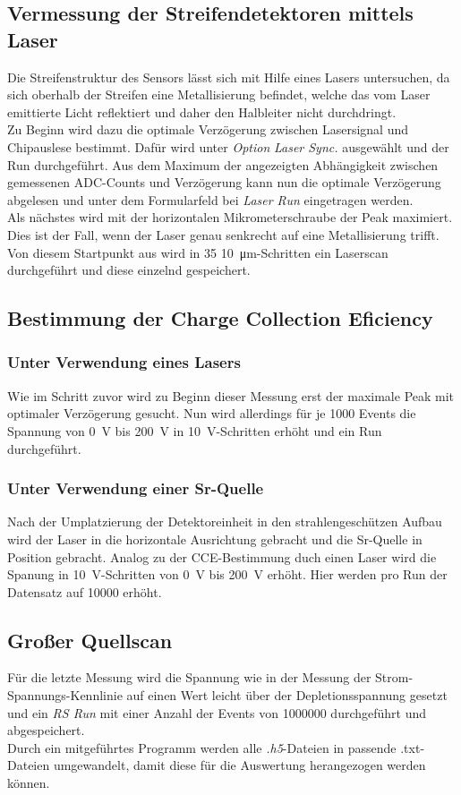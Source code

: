 \FloatBarrier
\subsection{Vermessung der Streifendetektoren mittels Laser}
\label{sec:Vermessung_Laser}
Die Streifenstruktur des Sensors lässt sich mit Hilfe eines Lasers untersuchen, da sich oberhalb der Streifen eine Metallisierung befindet, welche das vom Laser emittierte Licht reflektiert und daher den Halbleiter nicht durchdringt.\\
Zu Beginn wird dazu die optimale Verzögerung zwischen Lasersignal und Chipauslese bestimmt. Dafür wird unter \textit{Option} \textit{Laser Sync.} ausgewählt und der Run durchgeführt. Aus dem Maximum der angezeigten Abhängigkeit zwischen gemessenen ADC-Counts und Verzögerung kann nun die optimale Verzögerung abgelesen und unter dem Formularfeld bei \textit{Laser Run} eingetragen werden.\\
Als nächstes wird mit der horizontalen Mikrometerschraube der Peak maximiert. Dies ist der Fall, wenn der Laser genau senkrecht auf eine Metallisierung trifft. Von diesem Startpunkt aus wird in \num{35} \SI{10}{\micro\meter}-Schritten ein Laserscan durchgeführt und diese einzelnd gespeichert.


\subsection{Bestimmung der Charge Collection Eficiency}
\label{sec:CCE}
\subsubsection{Unter Verwendung eines Lasers}
Wie im Schritt zuvor wird zu Beginn dieser Messung erst der maximale Peak mit optimaler Verzögerung gesucht. Nun wird allerdings für je \num{1000} Events die Spannung von \SI{0}{\volt} bis \SI{200}{\volt} in \SI{10}{\volt}-Schritten erhöht und ein Run durchgeführt.

\subsubsection{Unter Verwendung einer Sr-Quelle}
Nach der Umplatzierung der Detektoreinheit in den strahlengeschützen Aufbau wird der Laser in die horizontale Ausrichtung gebracht und die Sr-Quelle in Position gebracht. Analog zu der CCE-Bestimmung duch einen Laser wird die Spanung in \SI{10}{\volt}-Schritten von \SI{0}{\volt} bis \SI{200}{\volt} erhöht. Hier werden pro Run der Datensatz auf \num{10000} erhöht.

\subsection{Großer Quellscan}
\label{sec:Quellscan}
Für die letzte Messung wird die Spannung wie in der Messung der Strom-Spannungs-Kennlinie auf einen Wert leicht über der Depletionsspannung gesetzt und ein \textit{RS Run} mit einer Anzahl der Events von \num{1000000} durchgeführt und abgespeichert.\\

Durch ein mitgeführtes Programm werden alle \textit{.h5}-Dateien in passende .txt-Dateien
umgewandelt, damit diese für die Auswertung herangezogen werden können.
